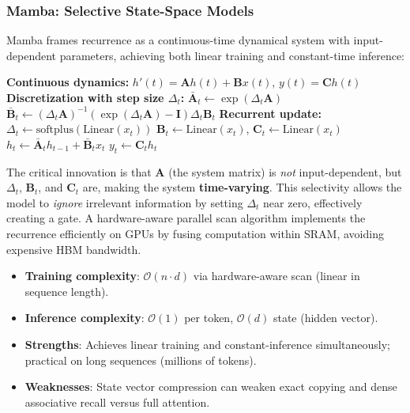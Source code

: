 \documentclass[11pt,a4paper]{article}
\begin{document}
\subsubsection{Mamba: Selective State-Space Models}
Mamba \citep{gu_mamba_2023} frames recurrence as a continuous-time dynamical system with input-dependent parameters, achieving both linear training and constant-time inference:

\begin{algorithmic}[1]
\State \textbf{Continuous dynamics:} $h'(t) = \mathbf{A} h(t) + \mathbf{B} x(t)$, \quad $y(t) = \mathbf{C} h(t)$
\State \textbf{Discretization with step size $\Delta_t$:}
\State $\bar{\mathbf{A}}_t \gets \exp(\Delta_t \mathbf{A})$
\State $\bar{\mathbf{B}}_t \gets (\Delta_t \mathbf{A})^{-1} (\exp(\Delta_t \mathbf{A}) - \mathbf{I}) \Delta_t \mathbf{B}_t$
\State \textbf{Recurrent update:}
    \State $\Delta_t \gets \text{softplus}(\text{Linear}(x_t))$ 
    \State $\mathbf{B}_t \gets \text{Linear}(x_t)$, \quad $\mathbf{C}_t \gets \text{Linear}(x_t)$ 
    \State $h_t \gets \bar{\mathbf{A}}_t h_{t-1} + \bar{\mathbf{B}}_t x_t$ 
    \State $y_t \gets \mathbf{C}_t h_t$ 
\EndFor
\end{algorithmic}

The critical innovation is that $\mathbf{A}$ (the system matrix) is \textit{not} input-dependent, but $\Delta_t$, $\mathbf{B}_t$, and $\mathbf{C}_t$ are, making the system \textbf{time-varying}. This selectivity allows the model to \textit{ignore} irrelevant information by setting $\Delta_t$ near zero, effectively creating a gate. A hardware-aware parallel scan algorithm implements the recurrence efficiently on GPUs by fusing computation within SRAM, avoiding expensive HBM bandwidth.

\begin{itemize}[leftmargin=*]
    \item \textbf{Training complexity}: $\mathcal{O}(n \cdot d)$ via hardware-aware scan (linear in sequence length).
    \item \textbf{Inference complexity}: $\mathcal{O}(1)$ per token, $\mathcal{O}(d)$ state (hidden vector).
    \item \textbf{Strengths}: Achieves linear training and constant-inference simultaneously; practical on long sequences (millions of tokens).
    \item \textbf{Weaknesses}: State vector compression can weaken exact copying and dense associative recall versus full attention.
\end{itemize}
\end{document}
